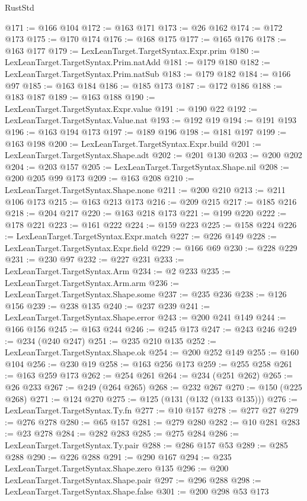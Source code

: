 \begin{lexlean}{RustStd}
\begin{coremodule}
@171 := @166 @104
@172 := @163 @171
@173 := @26 @162
@174 := @172 @173
@175 := @170 @174
@176 := @168 @175
@177 := @165 @176
@178 := @163 @177
@179 := LexLeanTarget.TargetSyntax.Expr.prim
@180 := LexLeanTarget.TargetSyntax.Prim.natAdd
@181 := @179 @180
@182 := LexLeanTarget.TargetSyntax.Prim.natSub
@183 := @179 @182
@184 := @166 @97
@185 := @163 @184
@186 := @185 @173
@187 := @172 @186
@188 := @183 @187
@189 := @163 @188
@190 := LexLeanTarget.TargetSyntax.Expr.value
@191 := @190 @22
@192 := LexLeanTarget.TargetSyntax.Value.nat
@193 := @192 @19
@194 := @191 @193
@196 := @163 @194 @173
@197 := @189 @196
@198 := @181 @197
@199 := @163 @198
@200 := LexLeanTarget.TargetSyntax.Expr.build
@201 := LexLeanTarget.TargetSyntax.Shape.adt
@202 := @201 @130
@203 := @200 @202
@204 := @203 @157
@205 := LexLeanTarget.TargetSyntax.Shape.nil
@208 := @200 @205 @99 @173
@209 := @163 @208
@210 := LexLeanTarget.TargetSyntax.Shape.none
@211 := @200 @210
@213 := @211 @106 @173
@215 := @163 @213 @173
@216 := @209 @215
@217 := @185 @216
@218 := @204 @217
@220 := @163 @218 @173
@221 := @199 @220
@222 := @178 @221
@223 := @161 @222
@224 := @159 @223
@225 := @158 @224
@226 := LexLeanTarget.TargetSyntax.Expr.match
@227 := @226 @149
@228 := LexLeanTarget.TargetSyntax.Expr.field
@229 := @166 @69
@230 := @228 @229
@231 := @230 @97
@232 := @227 @231
@233 := LexLeanTarget.TargetSyntax.Arm
@234 := @2 @233
@235 := LexLeanTarget.TargetSyntax.Arm.arm
@236 := LexLeanTarget.TargetSyntax.Shape.some
@237 := @235 @236
@238 := @126 @156
@239 := @238 @135
@240 := @237 @239
@241 := LexLeanTarget.TargetSyntax.Shape.error
@243 := @200 @241 @149
@244 := @166 @156
@245 := @163 @244
@246 := @245 @173
@247 := @243 @246
@249 := @234 (@240 @247)
@251 := @235 @210 @135
@252 := LexLeanTarget.TargetSyntax.Shape.ok
@254 := @200 @252 @149
@255 := @160 @104
@256 := @230 @19
@258 := @163 @256 @173
@259 := @255 @258
@261 := @163 @259 @173
@262 := @254 @261
@264 := @234 (@251 @262)
@265 := @26 @233
@267 := @249 (@264 @265)
@268 := @232 @267
@270 := @150 (@225 @268)
@271 := @124 @270
@275 := @125 (@131 (@132 (@133 @135)))
@276 := LexLeanTarget.TargetSyntax.Ty.fn
@277 := @10 @157
@278 := @277 @27
@279 := @276 @278
@280 := @65 @157
@281 := @279 @280
@282 := @10 @281
@283 := @23 @278
@284 := @282 @283
@285 := @275 @284
@286 := LexLeanTarget.TargetSyntax.Ty.pair
@288 := @286 @157 @53
@289 := @285 @288
@290 := @226 @288
@291 := @290 @167
@294 := @235 LexLeanTarget.TargetSyntax.Shape.zero @135
@296 := @200 LexLeanTarget.TargetSyntax.Shape.pair
@297 := @296 @288
@298 := LexLeanTarget.TargetSyntax.Shape.false
@301 := @200 @298 @53 @173

\end{coremodule}
\end{lexlean}

